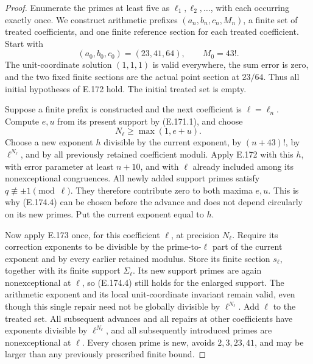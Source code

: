 \begin{proof}
Enumerate the primes at least five as
\(\ell_1,\ell_2,\ldots\), with each occurring exactly once.
We construct arithmetic prefixes \((a_n,b_n,c_n,M_n)\), a
finite set of treated coefficients, and one finite reference
section for each treated coefficient. Start with
\[
        (a_0,b_0,c_0)=(23,41,64),\qquad M_0=43!.
 \tag{E.174.3}
\]
The unit-coordinate solution \((1,1,1)\) is valid everywhere,
the sum error is zero, and the two fixed finite sections are
the actual point section at \(23/64\). Thus all initial
hypotheses of E.172 hold. The initial treated set is empty.

Suppose a finite prefix is constructed and the next coefficient
is \(\ell=\ell_n\). Compute \(e,u\) from its present
support by (E.171.1), and choose
\[
                N_\ell\ge\max(1,e+u).
 \tag{E.174.4}
\]
Choose a new exponent \(h\) divisible by the current exponent,
by \((n+43)!\), by \(\ell^{N_\ell}\), and by all
previously retained coefficient moduli. Apply E.172 with this
\(h\), with error parameter at least \(n+10\), and with
\(\ell\) already included among its nonexceptional congruences.
All newly added support primes satisfy
\(q\not\equiv\pm1\pmod\ell\). They therefore contribute
zero to both maxima \(e,u\). This is why (E.174.4) can be
chosen before the advance and does not depend circularly on
its new primes. Put the current exponent equal to \(h\).

Now apply E.173 once, for this coefficient \(\ell\), at
precision \(N_\ell\). Require its correction exponents to
be divisible by the prime-to-\(\ell\) part of the current
exponent and by every earlier retained modulus. Store its
finite section \(s_\ell\), together with its finite support
\(\Sigma_\ell\). Its new support primes are again
nonexceptional at \(\ell\), so (E.174.4) still holds for
the enlarged support. The arithmetic exponent and its local
unit-coordinate invariant remain valid, even though this single
repair need not be globally divisible by \(\ell^{N_\ell}\).
Add \(\ell\) to the treated set. All subsequent advances
and all repairs at other coefficients have exponents divisible
by \(\ell^{N_\ell}\), and all subsequently introduced
primes are nonexceptional at \(\ell\). Every chosen prime
is new, avoids \(2,3,23,41\), and may be larger than any
previously prescribed finite bound.


\end{proof}
